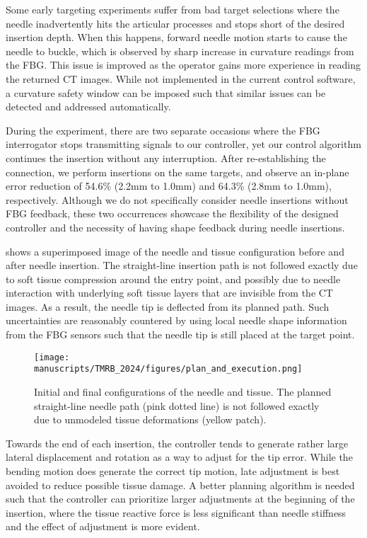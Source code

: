 Some early targeting experiments suffer from bad target selections where the needle inadvertently hits the articular processes and stops short of the desired insertion depth. When this happens, forward needle motion starts to cause the needle to buckle, which is observed by sharp increase in curvature readings from the FBG. This issue is improved as the operator gains more experience in reading the returned CT images. While not implemented in the current control software, a curvature safety window can be imposed such that similar issues can be detected and addressed automatically.

During the experiment, there are two separate occasions where the FBG interrogator stops transmitting signals to our controller, yet our control algorithm continues the insertion without any interruption. After re-establishing the connection, we perform insertions on the same targets, and observe an in-plane error reduction of 54.6\% (2.2mm to 1.0mm) and 64.3\% (2.8mm to 1.0mm), respectively. Although we do not specifically consider needle insertions without FBG feedback, these two occurrences showcase the flexibility of the designed controller and the necessity of having shape feedback during needle insertions.

 shows a superimposed image of the needle and tissue configuration before and after needle insertion. The straight-line insertion path is not followed exactly due to soft tissue compression around the entry point, and possibly due to needle interaction with underlying soft tissue layers that are invisible from the CT images. As a result, the needle tip is deflected from its planned path. Such uncertainties are reasonably countered by using local needle shape information from the FBG sensors such that the needle tip is still placed at the target point.

\begin{figure}[t]
  \centering
  \texttt{[image: manuscripts/TMRB\_2024/figures/plan\_and\_execution.png]}
  \caption{Initial and final configurations of the needle and tissue. The planned straight-line needle path (pink dotted line) is not followed exactly due to unmodeled tissue deformations (yellow patch).}
  \label{fig:chap-3-plan-and-execution}
\end{figure}

Towards the end of each insertion, the controller tends to generate rather large lateral displacement and rotation as a way to adjust for the tip error. While the bending motion does generate the correct tip motion, late adjustment is best avoided to reduce possible tissue damage. A better planning algorithm is needed such that the controller can prioritize larger adjustments at the beginning of the insertion, where the tissue reactive force is less significant than needle stiffness and the effect of adjustment is more evident.

